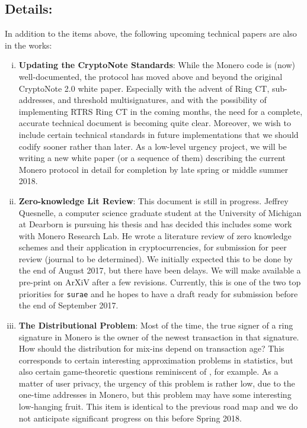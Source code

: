 \documentclass[12pt,english]{mrl}
\theoremstyle{definition}
\numberwithin{equation}{section}
\numberwithin{figure}{section}
\numberwithin{equation}{section}
\numberwithin{equation}{section}
\numberwithin{figure}{section}
\begin{document}
\subsection{Details:}
In addition to the items above, the following upcoming technical papers are also in the works:
\begin{enumerate}[(i)]
\item \textbf{Updating the CryptoNote Standards}: While the Monero code is (now) well-documented, the protocol has moved above and beyond the original CryptoNote 2.0 white paper. Especially with the advent of Ring CT, sub-addresses, and threshold multisignatures, and with the possibility of implementing RTRS Ring CT in the coming months, the need for a complete, accurate technical document is becoming quite clear. Moreover, we wish to include certain technical standards in future implementations that we should codify sooner rather than later.  As a low-level urgency project, we will be writing a new white paper (or a sequence of them) describing the current Monero protocol in detail for completion by late spring or middle summer 2018.

\item \textbf{Zero-knowledge Lit Review}: This document is still in progress.  Jeffrey Quesnelle, a computer science graduate student at the University of Michigan at Dearborn is pursuing his thesis and has decided this includes some work with Monero Research Lab. He wrote a literature review of zero knowledge schemes and their application in cryptocurrencies, for submission for peer review (journal to be determined). We initially expected this to be done by the end of August 2017, but there have been delays. We will make available a pre-print on ArXiV after a few revisions. Currently, this is one of the two top priorities for \texttt{surae} and he hopes to have a draft ready for submission before the end of September 2017.

\item \textbf{The Distributional Problem}: Most of the time, the true signer of a ring signature in Monero is the owner of the newest transaction in that signature. How should the distribution for mix-ins depend on transaction age? This corresponds to certain interesting approximation problems in statistics, but also certain game-theoretic questions reminiscent of \cite{T-1955}, for example. As a matter of user privacy, the urgency of this problem is rather low, due to the one-time addresses in Monero, but this problem may have some interesting low-hanging fruit. This item is identical to the previous road map and we do not anticipate significant progress on this before Spring 2018.

\end{enumerate}
\end{document}
